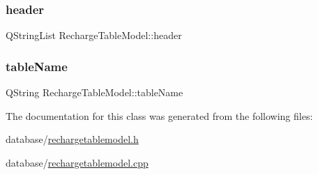 \subsubsection{\texorpdfstring{header}{header}}
{\footnotesize\ttfamily Q\+String\+List Recharge\+Table\+Model\+::header\hspace{0.3cm}{\ttfamily [private]}}

\mbox{\label{class_recharge_table_model_a710733d9714fdf177f2f31507c42180c}} 
\subsubsection{\texorpdfstring{tableName}{tableName}}
{\footnotesize\ttfamily Q\+String Recharge\+Table\+Model\+::table\+Name\hspace{0.3cm}{\ttfamily [private]}}



The documentation for this class was generated from the following files\+:\begin{DoxyCompactItemize}
\item 
database/\mbox{\hyperlink{rechargetablemodel_8h}{rechargetablemodel.\+h}}\item 
database/\mbox{\hyperlink{rechargetablemodel_8cpp}{rechargetablemodel.\+cpp}}\end{DoxyCompactItemize}
